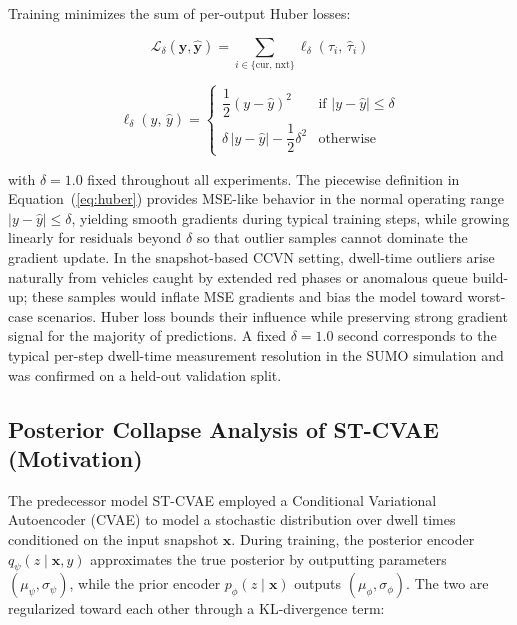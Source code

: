 \documentclass[journal]{IEEEtran}
\begin{document}
Training minimizes the sum of per-output Huber losses:

\begin{equation}
\mathcal{L}_\delta(\mathbf{y}, \hat{\mathbf{y}}) = \sum_{i \in \{\text{cur},\,\text{nxt}\}} \ell_\delta(\tau_i,\, \hat{\tau}_i)
\label{eq:total_loss}
\end{equation}

\begin{equation}
\ell_\delta(y,\, \hat{y}) =
\begin{cases}
\dfrac{1}{2}(y - \hat{y})^2 & \text{if } |y - \hat{y}| \le \delta \\[6pt]
\delta\,|y - \hat{y}| - \dfrac{1}{2}\delta^2 & \text{otherwise}
\end{cases}
\label{eq:huber}
\end{equation}

with $\delta = 1.0$ fixed throughout all experiments.
The piecewise definition in Equation~(\ref{eq:huber}) provides MSE-like behavior in the normal operating range $|y - \hat{y}| \le \delta$, yielding smooth gradients during typical training steps, while growing linearly for residuals beyond $\delta$ so that outlier samples cannot dominate the gradient update.
In the snapshot-based CCVN setting, dwell-time outliers arise naturally from vehicles caught by extended red phases or anomalous queue build-up; these samples would inflate MSE gradients and bias the model toward worst-case scenarios.
Huber loss bounds their influence while preserving strong gradient signal for the majority of predictions.
A fixed $\delta = 1.0$ second corresponds to the typical per-step dwell-time measurement resolution in the SUMO simulation and was confirmed on a held-out validation split.

\subsection{Posterior Collapse Analysis of ST-CVAE (Motivation)}
\label{sec.prop.F}

The predecessor model ST-CVAE employed a Conditional Variational Autoencoder (CVAE) to model a stochastic distribution over dwell times conditioned on the input snapshot $\mathbf{x}$.
During training, the posterior encoder $q_\psi(z \mid \mathbf{x}, y)$ approximates the true posterior by outputting parameters $(\mu_\psi, \sigma_\psi)$, while the prior encoder $p_\phi(z \mid \mathbf{x})$ outputs $(\mu_\phi, \sigma_\phi)$.
The two are regularized toward each other through a KL-divergence term:
\end{document}
